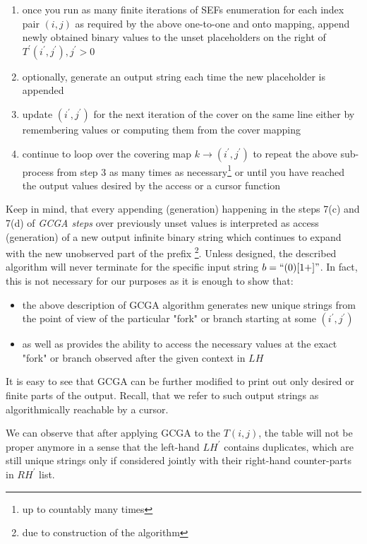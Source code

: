 \begin{enumerate}
\begin{enumerate}
          \item once you run as many finite iterations of SEFs enumeration for each index pair $(i, j)$  as required by the above one-to-one and onto mapping, append newly obtained binary values to the unset placeholders on the right of $T^\prime(i^\prime,j^\prime), j^\prime > 0$
          \item optionally, generate an output string each time the new placeholder is appended
          \item update $(i^\prime,j^\prime)$ for the next iteration of the cover on the same line either by remembering values or computing them from the cover mapping
          \item continue to loop over the covering map $k \rightarrow (i^\prime,j^\prime)$ to repeat the above sub-process from step 3 as many times as necessary\footnote{up to countably many times} or until you have reached the output values desired by the access or a cursor function
        \end{enumerate}
\end{enumerate}

Keep in mind, that every appending (generation) happening in the steps 7(c) and 7(d) of \textit{GCGA steps} over previously unset values is interpreted as access (generation) of a new output infinite binary string which continues to expand with the new unobserved part of the prefix \footnote{due to construction of the algorithm}. Unless designed, the described algorithm will never terminate for the specific input string $b = \text{``}(0)[1+]\text{''}$. In fact, this is not necessary for our purposes as it is enough to show that:
\begin{itemize}
  \item the above description of GCGA algorithm generates new unique strings from the point of view of the particular "fork" or branch starting at some $(i^\prime,j^\prime)$
  \item as well as provides the ability to access the necessary values at the exact "fork" or branch observed after the given context in $LH$
\end{itemize}

It is easy to see that GCGA can be further modified to print out only desired or finite parts of the output. Recall, that we refer to such output strings as algorithmically reachable by a cursor.

We can observe that after applying GCGA to the $T(i,j)$, the table will not be proper anymore in a sense that the left-hand $LH^\prime$ contains duplicates, which are still unique strings only if considered jointly with their right-hand counter-parts in $RH^\prime$ list.

